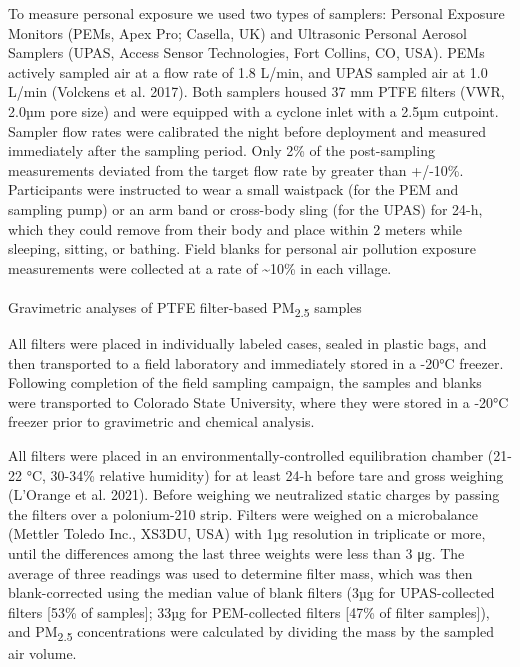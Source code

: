 \documentclass[
  letterpaper,
  DIV=11,
  numbers=noendperiod]{scrartcl}
\makeatletter
\let\oldparagraph\paragraph
\renewcommand{\paragraph}{ %
    \@ifstar %
      \xxxParagraphStar %
      \xxxParagraphNoStar %
  } %
\newcommand{\xxxParagraphStar}[1]{\oldparagraph*{#1}\mbox{}} %
\newcommand{\xxxParagraphNoStar}[1]{\oldparagraph{#1}\mbox{}} %
\providecommand{\DIFaddbegin}{} %
\providecommand{\DIFaddend}{} %
\providecommand{\DIFdelbegin}{} %
\providecommand{\DIFdelend}{} %
\newcommand{\DIFscaledelfig}{0.5}
\newlength{\DIFdelgraphicswidth} %
\newlength{\DIFdelgraphicsheight} %
\newcommand{\DIFaddincludegraphics}[2][]{{\color{blue}\fbox{\DIFOincludegraphics[#1]{#2}}}} %
\newcommand{\DIFdelincludegraphics}[2][]{%
\sbox{\DIFdelgraphicsbox}{\DIFOincludegraphics[#1]{#2}}%
\settoboxwidth{\DIFdelgraphicswidth}{\DIFdelgraphicsbox} %
\settoboxtotalheight{\DIFdelgraphicsheight}{\DIFdelgraphicsbox} %
\scalebox{\DIFscaledelfig}{%
\parbox[b]{\DIFdelgraphicswidth}{\usebox{\DIFdelgraphicsbox}\\[-\baselineskip] \rule{\DIFdelgraphicswidth}{0em}}\llap{\resizebox{\DIFdelgraphicswidth}{\DIFdelgraphicsheight}{%
\setlength{\unitlength}{\DIFdelgraphicswidth}%
\begin{picture}(1,1)%
\thicklines\linethickness{2pt} %
{\color[rgb]{1,0,0}\put(0,0){\framebox(1,1){}}}%
{\color[rgb]{1,0,0}\put(0,0){\line( 1,1){1}}}%
{\color[rgb]{1,0,0}\put(0,1){\line(1,-1){1}}}%
\end{picture}%
}\hspace*{3pt}}} %
} %
\DeclareRobustCommand{\DIFaddbegin}{\DIFOaddbegin \let\includegraphics\DIFaddincludegraphics} %
\DeclareRobustCommand{\DIFaddend}{\DIFOaddend \let\includegraphics\DIFOincludegraphics} %
\DeclareRobustCommand{\DIFdelbegin}{\DIFOdelbegin \let\includegraphics\DIFdelincludegraphics} %
\DeclareRobustCommand{\DIFdelend}{\DIFOaddend \let\includegraphics\DIFOincludegraphics} %
\makeatother
\begin{document}
To measure personal exposure we used two types of samplers: Personal
Exposure Monitors (PEMs, Apex Pro; Casella, UK) and Ultrasonic Personal
Aerosol Samplers (UPAS, Access Sensor Technologies, Fort Collins, CO,
USA). PEMs actively sampled air at a flow rate of 1.8 L/min, and UPAS
sampled air at 1.0 L/min (Volckens et al. 2017). Both samplers housed 37
mm PTFE filters (VWR, 2.0µm pore size) and were equipped with a cyclone
inlet with a 2.5µm cutpoint. Sampler flow rates were calibrated the
night before deployment and measured immediately after the sampling
period. Only 2\% of the post-sampling measurements deviated from the
target flow rate by greater than +/-10\%. Participants were instructed
to wear a small waistpack (for the PEM and sampling pump) or an arm band
or cross-body sling (for the UPAS) for 24-h, which they could remove
from their body and place within 2 meters while sleeping, sitting, or
bathing. Field blanks for personal air pollution exposure measurements
were collected at a rate of \textasciitilde10\% in each village.

\DIFdelbegin %
\DIFdelend \DIFaddbegin \paragraph{\texorpdfstring{Gravimetric analyses of PTFE filter-based
PM\textsubscript{2.5}
samples}{Gravimetric analyses of PTFE filter-based PM2.5 samples}}\label{gravimetric-analyses-of-ptfe-filter-based-pm2.5-samples}
\DIFaddend 

All filters were placed in individually labeled cases, sealed in plastic
bags, and then transported to a field laboratory and immediately stored
in a -20°C freezer. Following completion of the field sampling campaign,
the samples and blanks were transported to Colorado State University,
where they were stored in a -20°C freezer prior to gravimetric and
chemical analysis.

All filters were placed in an environmentally-controlled equilibration
chamber (21-22 °C, 30-34\% relative humidity) for at least 24-h before
tare and gross weighing (L'Orange et al. 2021). Before weighing we
neutralized static charges by passing the filters over a polonium-210
strip. Filters were weighed on a microbalance (Mettler Toledo Inc.,
XS3DU, USA) with 1µg resolution in triplicate or more, until the
differences among the last three weights were less than 3 μg. The
average of three readings was used to determine filter mass, which was
then blank-corrected using the median value of blank filters (3µg for
UPAS-collected filters {[}53\% of samples{]}; 33µg for PEM-collected
filters {[}47\% of filter samples{]}), and PM\textsubscript{2.5}
concentrations were calculated by dividing the mass by the sampled air
volume.
\end{document}
